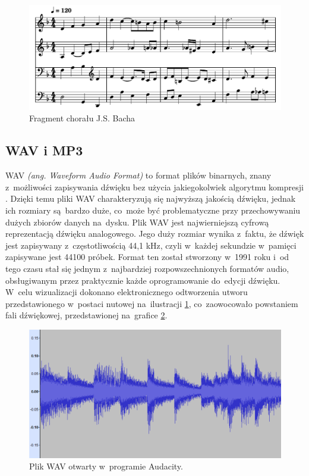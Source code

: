 \documentclass[data-science]{agh-wi} %
\begin{document}
\begin{figure}
    \begin{center}
        \includegraphics[width=0.9\linewidth]{./img/jsb_7_sheet.pdf}
    \end{center}
    \caption{Fragment chorału J.S. Bacha}\label{fig:jsb_sheet}
\end{figure}
\subsection{WAV i MP3}
WAV \textit{(ang. Waveform Audio Format)} to format plików binarnych, znany z~możliwości zapisywania dźwięku bez użycia jakiegokolwiek algorytmu kompresji \cite{wav_specification}. Dzięki temu pliki WAV charakteryzują się najwyższą jakością dźwięku, jednak ich rozmiary są~bardzo duże, co~może być problematyczne przy przechowywaniu dużych zbiorów danych na~dysku. Plik WAV jest najwierniejszą cyfrową reprezentacją dźwięku analogowego. Jego duży rozmiar wynika z~faktu, że dźwięk jest zapisywany z~częstotliwością 44,1 kHz, czyli w~każdej sekundzie w~pamięci zapisywane jest 44100 próbek. Format ten został stworzony w~1991 roku i~od tego czasu stał się jednym z~najbardziej rozpowszechnionych formatów audio, obsługiwanym przez praktycznie każde oprogramowanie do~edycji dźwięku. W~celu wizualizacji dokonano elektronicznego odtworzenia utworu przedstawionego w~postaci nutowej na~ilustracji \ref*{fig:jsb_sheet}, co~zaowocowało powstaniem fali dźwiękowej, przedstawionej na~grafice \ref*{fig:jsb_wav}.

\begin{figure}
    \begin{center}
        \includegraphics[width=\linewidth]{./img/jsb_wav.png}
    \end{center}
    \caption{Plik WAV otwarty w~programie Audacity.}\label{fig:jsb_wav}
\end{figure}
\end{document}
